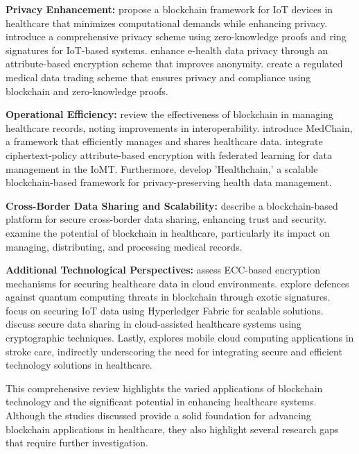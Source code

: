 \documentclass[cic,tc,english]{iiufrgs}
\begin{document}
    \textbf{Privacy Enhancement:} \citet{Dwivedi2019} propose a blockchain framework for IoT devices in healthcare that minimizes computational demands while enhancing privacy. \citet{Esfahani2024} introduce a comprehensive privacy scheme using zero-knowledge proofs and ring signatures for IoT-based systems. \citet{Zala2024} enhance e-health data privacy through an attribute-based encryption scheme that improves anonymity. \citet{Li2024} create a regulated medical data trading scheme that ensures privacy and compliance using blockchain and zero-knowledge proofs.
    
    \textbf{Operational Efficiency:} \citet{Vazirani2019} review the effectiveness of blockchain in managing healthcare records, noting improvements in interoperability. \citet{Shen2019} introduce MedChain, a framework that efficiently manages and shares healthcare data. \citet{Bhansali2022} integrate ciphertext-policy attribute-based encryption with federated learning for data management in the IoMT. Furthermore, \citet{XuJie2019} develop 'Healthchain,' a scalable blockchain-based framework for privacy-preserving health data management.
    
    \textbf{Cross-Border Data Sharing and Scalability:} \citet{Rahman2020} describe a blockchain-based platform for secure cross-border data sharing, enhancing trust and security. \citet{Saeed2022} examine the potential of blockchain in healthcare, particularly its impact on managing, distributing, and processing medical records.
    
    \textbf{Additional Technological Perspectives:} \citet{Hema2019} assess ECC-based encryption mechanisms for securing healthcare data in cloud environments. \citet{Naz2024} explore defences against quantum computing threats in blockchain through exotic signatures. \citet{Eghmazi2024} focus on securing IoT data using Hyperledger Fabric for scalable solutions. \citet{XuChang2019} discuss secure data sharing in cloud-assisted healthcare systems using cryptographic techniques. Lastly, \citet{Karaca2019} explores mobile cloud computing applications in stroke care, indirectly underscoring the need for integrating secure and efficient technology solutions in healthcare.

    This comprehensive review highlights the varied applications of blockchain technology and the significant potential in enhancing healthcare systems. Although the studies discussed provide a solid foundation for advancing blockchain applications in healthcare, they also highlight several research gaps that require further investigation.
\end{document}
